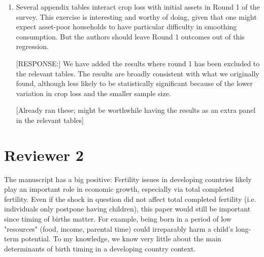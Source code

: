 \documentclass[letterpaper,12pt]{article}
\begin{document}
\begin{enumerate}
\item Several appendix tables interact crop loss with initial assets in
Round 1 of the survey. This exercise is interesting and worthy of doing,
given that one might expect asset-poor households to have particular
difficulty in smoothing consumption. But the authors should leave Round
1 outcomes out of this regression.

[RESPONSE:] We have added the results where round 1 has been excluded
to the relevant tables.
The results are broadly consistent with what we originally found, 
although less likely to be statistically significant 
because of the lower variation in crop loss and the smaller sample
size.

[Already ran these; might be worthwhile having the results as an extra
panel in the relevant tables]


\end{enumerate}



\newpage

\section*{Reviewer 2}


The manuscript has a big positive: Fertility issues in developing
countries likely play an important role in economic growth, especially
via total completed fertility. Even if the shock in question did not
affect total completed fertility (i.e. individuals only postpone having
children), this paper would still be important since timing of births
matter. For example, being born in a period of low "resources" (food,
income, parental time) could irreparably harm a child's long-term
potential. To my knowledge, we know very little about the main
determinants of birth timing in a developing country context.
\end{document}
